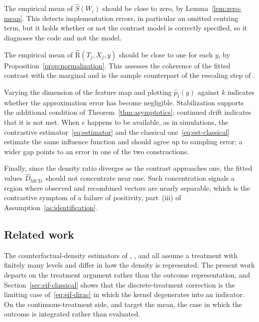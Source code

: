 \documentclass[11pt]{article}
\theoremstyle{plain}
\theoremstyle{definition}
\theoremstyle{remark}
\newcommand{\mcd}{\text{MCD}\,}
\newcommand{\contrasthat}{\widehat{D}_{\mcd}}
\newcommand{\DensityRatio}{\text{R}}
\newcommand{\ks}{k}
\newcommand{\gps}{e}
\newcommand{\score}{S}
\begin{document}
The empirical mean of $\widehat\score(W_i)$ should be close to zero, by
Lemma~\ref{lem:zero-mean}. This detects implementation errors, in particular an omitted
centring term, but it holds whether or not the contrast model is correctly specified, so it
diagnoses the code and not the model.

The empirical mean of $\widehat{\DensityRatio}(T_j,X_j,y)$ should be close to one for each
$y$, by Proposition~\ref{prop:normalization}. This assesses the coherence of the fitted
contrast with the marginal and is the sample counterpart of the rescaling step of
\citet{meziani2025mcd}.

Varying the dimension of the feature map and plotting $\widehat p_t(y)$ against $\ks$ indicates
whether the approximation error has become negligible. Stabilization supports the additional
condition of Theorem~\ref{thm:asymptotics}; continued drift indicates that it is not met. When
$\gps$ happens to be available, as in simulations, the contrastive estimator~\eqref{eq:estimator}
and the classical one~\eqref{eq:est-classical} estimate the same influence function and should
agree up to sampling error; a wider gap points to an error in one of the two constructions.

Finally, since the density ratio diverges as the contrast approaches one, the fitted values
$\contrasthat$ should not concentrate near one. Such concentration signals a region where
observed and recombined vectors are nearly separable, which is the contrastive symptom of a
failure of positivity, part~(iii) of Assumption~\ref{as:identification}.

\subsection{Related work}
\label{sec:discussion-lit}

The counterfactual-density estimators of \citet{kennedy2023density},
\citet{melnychuk2023flows}, \citet{ham2024logconcave} and \citet{martinez2023stein} all assume
a treatment with finitely many levels and differ in how the density is represented. The present
work departs on the treatment argument rather than the outcome representation, and
Section~\ref{sec:eif-classical} shows that the discrete-treatment correction is the limiting
case of~\eqref{eq:eif-dirac} in which the kernel degenerates into an indicator. On the
continuous-treatment side, \citet{kennedy2017continuous} and \citet{colangelo2020} target the
mean, the case in which the outcome is integrated rather than evaluated.
\end{document}
